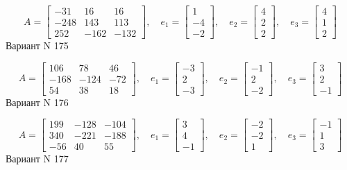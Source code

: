 \documentclass[11pt]{report}
\begin{document}
$$A = \left[\begin{matrix}-31 & 16 & 16\\-248 & 143 & 113\\252 & -162 & -132\end{matrix}\right],\quad e_1 = \left[\begin{matrix}1\\-4\\-2\end{matrix}\right],\quad e_2 = \left[\begin{matrix}4\\2\\2\end{matrix}\right],\quad e_3 = \left[\begin{matrix}4\\1\\2\end{matrix}\right]$$Вариант N 175

$$A = \left[\begin{matrix}106 & 78 & 46\\-168 & -124 & -72\\54 & 38 & 18\end{matrix}\right],\quad e_1 = \left[\begin{matrix}-3\\2\\-3\end{matrix}\right],\quad e_2 = \left[\begin{matrix}-1\\2\\-2\end{matrix}\right],\quad e_3 = \left[\begin{matrix}3\\2\\-1\end{matrix}\right]$$Вариант N 176

$$A = \left[\begin{matrix}199 & -128 & -104\\340 & -221 & -188\\-56 & 40 & 55\end{matrix}\right],\quad e_1 = \left[\begin{matrix}3\\4\\-1\end{matrix}\right],\quad e_2 = \left[\begin{matrix}-2\\-2\\1\end{matrix}\right],\quad e_3 = \left[\begin{matrix}-1\\1\\3\end{matrix}\right]$$Вариант N 177
\end{document}
